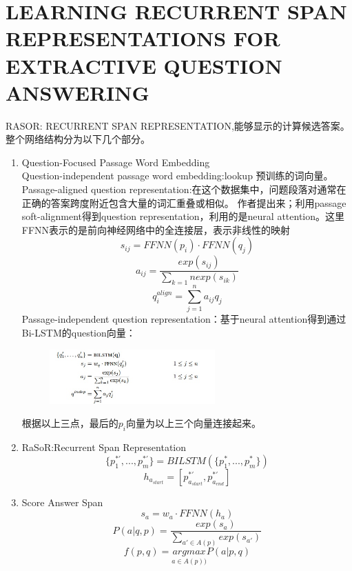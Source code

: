 \documentclass[a4paper,UTF8]{article}
\numberwithin{equation}{section}
\begin{document}
\section{LEARNING RECURRENT SPAN REPRESENTATIONS FOR EXTRACTIVE QUESTION ANSWERING}
RASOR: RECURRENT SPAN REPRESENTATION,能够显示的计算候选答案。整个网络结构分为以下几个部分。
\begin{enumerate}
    \item Question-Focused Passage Word Embedding\\
        \subitem{[1]} Question-independent passage word embedding:lookup 预训练的词向量。
        \subitem{[2]} Passage-aligned question representation:在这个数据集中，问题段落对通常在正确的答案跨度附近包含大量的词汇重叠或相似。
        作者提出来；利用passage soft-alignment得到question representation，利用的是neural attention。这里FFNN表示的是前向神经网络中的全连接层，表示非线性的映射
        $$s_{ij} = FFNN(p_i)\cdot FFNN(q_j)$$
        $$a_{ij} = \frac{exp(s_{ij})}{\sum_{k=1}{n}exp(s_{ik})}$$
        $$q_i^{align}=\sum_{j=1}^n a_{ij}q_j$$
        \subitem{[3]} Passage-independent question representation：基于neural attention得到通过Bi-LSTM的question向量：
        \begin{figure}[H]
            \centering
            \includegraphics[width=0.6\textwidth]{9-2.jpg}
        \end{figure}
        根据以上三点，最后的$p_i$向量为以上三个向量连接起来。
    \item RaSoR:Recurrent Span Representation\\$$\{p_1^{*'},...,p_m^{*'}\}=BILSTM(\{p_1^{*},...,p_m^{*}\})$$
    $$h_{a_{start}}=[p_{a_{start}}^{*'},p_{a_{end}}^{*'}]$$
    \item Score Answer Span\\
    $$s_a = w_a \cdot FFNN(h_a)$$
    $$P(a|q,p)=\frac{exp(s_a)}{\sum_{a' \in A(p)} exp(s_{a'})} $$
    $$f(p,q) = \underset{a \in A(p))}{argmax} P(a|p,q)$$
\end{enumerate}
\end{document}
